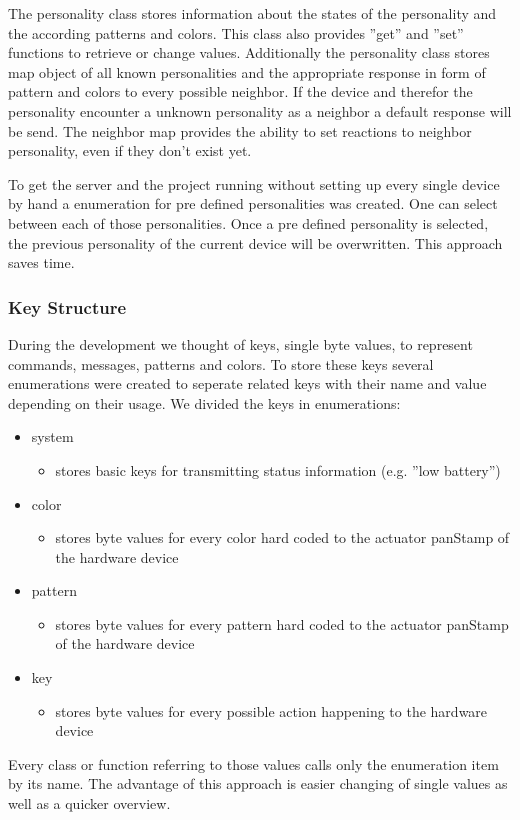 The personality class stores information about the states of the personality and the according patterns and colors. This class also provides ''get'' and ''set'' functions to retrieve or change values. Additionally the personality class stores map object of all known personalities and the appropriate response in form of pattern and colors to every possible neighbor. If the device and therefor the personality encounter a unknown personality as a neighbor a default response will be send. 
The neighbor map provides the ability to set reactions to neighbor personality, even if they don't exist yet.

To get the server and the project running without setting up every single device by hand a enumeration for pre defined personalities was created. One can select between each of those personalities. Once a pre defined personality is selected, the previous personality of the current device will be overwritten. This approach saves time.

\subsubsection{Key Structure}
During the development we thought of keys, single byte values, to represent commands, messages, patterns and colors. To store these keys several enumerations were created to seperate related keys with their name and value depending on their usage.
We divided the keys in enumerations:
\begin{itemize}
    \item system
    \begin{itemize}
         \item stores basic keys for transmitting status information (e.g. ''low battery'')
    \end{itemize}
    \item color
    \begin{itemize}
        \item stores byte values for every color hard coded to the actuator panStamp of the hardware device
    \end{itemize}
    \item pattern
    \begin{itemize}
        \item stores byte values for every pattern hard coded to the actuator panStamp of the hardware device
    \end{itemize}
    \item key
    \begin{itemize}
        \item stores byte values for every possible action happening to the hardware device
    \end{itemize}
\end{itemize} 

Every class or function referring to those values calls only the enumeration item by its name. The advantage of this approach is easier changing of single values as well as a quicker overview.
